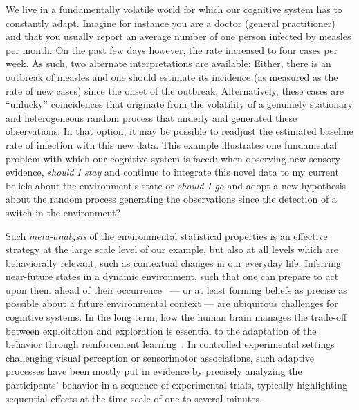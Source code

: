 \documentclass[12pt,english]{article}%
\newcommand{\citep}[1]{\parencite{#1}}
\begin{document}
We live in a fundamentally volatile world for which
our cognitive system has to constantly adapt.
Imagine for instance you are a doctor (general practitioner) and
that you usually report an average number of
one person infected by measles per month.
On the past few days however,
the rate increased to four cases per week.
As such, two alternate interpretations are available:
Either, there is an outbreak of measles and
one should estimate its incidence
(as measured as the rate of new cases)
since the onset of the outbreak.
Alternatively, these cases are
``unlucky'' coincidences that originate from the volatility
of a genuinely stationary and heterogeneous random process
that underly and generated these observations.
In that option, it may be possible to readjust
the estimated baseline rate of infection with this new data.
This example illustrates one fundamental problem
with which our cognitive system is faced:
when observing new sensory evidence,
\emph{should I stay} and continue to integrate this novel data
to my current beliefs about the environment's state
or \emph{should I go} and adopt a new hypothesis
about the random process generating the observations
since the detection of a switch in the environment?

Such \emph{meta-analysis} of the environmental statistical properties is an effective strategy at the large scale level of our example,
but also at all levels which are behaviorally relevant,
such as contextual changes in our everyday life.
Inferring near-future states in a dynamic environment, such that one can prepare to act upon them ahead of their occurrence~\citep{PerrinetAdamasFriston2014} ---
or at least forming beliefs as precise as possible
about a future environmental context ---
are ubiquitous challenges for cognitive systems.
In the long term, how the human brain manages
the trade-off between exploitation and exploration
is essential to the adaptation
of the behavior through reinforcement learning~\citep{Cohen2007}.
In controlled experimental settings challenging visual perception or sensorimotor associations,
such adaptive processes have been mostly put in evidence
by precisely analyzing the participants' behavior in a sequence of experimental trials,
typically highlighting sequential effects
at the time scale of one to several minutes.
\end{document}

